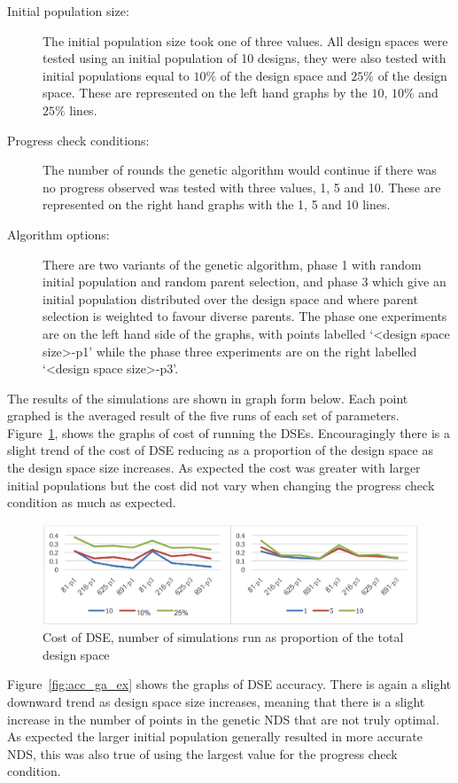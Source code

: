 \begin{description}
\item[Initial population size:] The initial population size took one of three values.  All design spaces were tested using an initial population of 10 designs, they were also tested with initial populations equal to $10\%$ of the design space and $25\%$ of the design space.  These are represented on the left hand graphs by the $10$, $10\%$ and $25\%$ lines.
\item[Progress check conditions:] The number of rounds the genetic algorithm would continue if there was no progress observed was tested with three values, 1, 5 and 10.  These are represented on the right hand graphs with the 1, 5 and 10 lines.

\item[Algorithm options:] There are two variants of the genetic algorithm, phase 1 with random initial population and random parent selection, and phase 3 which give an initial population distributed over the design space and where parent selection is weighted to favour diverse parents.  The phase one experiments are on the left hand side of the graphs, with points labelled `<design space size>-p1' while the phase three experiments are on the right labelled `<design space size>-p3'.
\end{description}

The results of the simulations are shown in graph form below.  Each point graphed is the averaged result of the five runs of each set of parameters.  Figure~\ref{fig:cost_ga_ex}, shows the graphs of cost of running the DSEs.  Encouragingly there is a slight trend of the cost of DSE reducing as a proportion of the design space as the design space size increases.  As expected the cost was greater with larger initial populations but the cost did not vary when changing the progress check condition as much as expected.

\begin{figure}[p]
	\centering
	\includegraphics[width=1\textwidth]{figures/ga_cost}
	\caption{Cost of DSE, number of simulations run as proportion of the total design space}
	\label{fig:cost_ga_ex}
\end{figure}
Figure~\ref{fig:acc_ga_ex} shows the graphs of DSE accuracy.  There is again a slight downward trend as design space size increases, meaning that there is a slight increase in the number of points in the genetic NDS that are not truly optimal.  As expected the larger initial population generally resulted in more accurate NDS, this was also true of using the largest value for the progress check condition.

